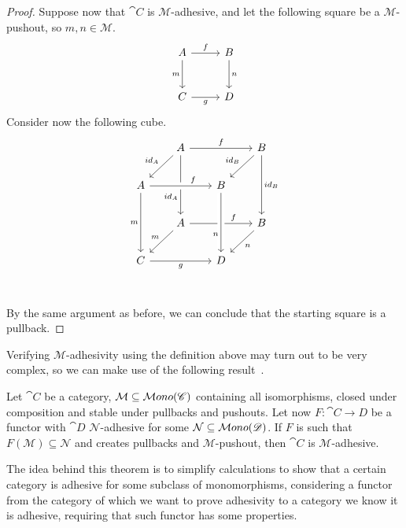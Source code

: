 \begin{proof}
	Suppose now that $\cat C$ is $\mathcal{M}$-adhesive, and let the following square be a $\mathcal{M}$-pushout, so $m, n \in \mathcal{M}$.
	\[\begin{tikzcd}[row sep = 26, column sep = 26]
		A \ar[r, "f"] \ar[d, "m"swap] & B \ar[d, "n"] \\
		C \ar[r, "g"swap] & D
	\end{tikzcd}\]
	Consider now the following cube.
	\[\begin{tikzcd}[row sep = 20, column sep = 20]
	& A && B \\
	A && B \\
	& A && B \\
	C && D \\
	& {}
	\arrow["f", from=1-2, to=1-4]
	\arrow["{id_A}"', from=1-2, to=2-1]
	\arrow["{id_A}"'{pos=0.7}, from=1-2, to=3-2]
	\arrow["{id_B}"', from=1-4, to=2-3]
	\arrow["{id_B}", from=1-4, to=3-4]
	\arrow["m"', from=2-1, to=4-1]
	\arrow["f"{pos=0.7}, from=3-2, to=3-4]
	\arrow["m"', from=3-2, to=4-1]
	\arrow["n", from=3-4, to=4-3]
	\arrow["g"', from=4-1, to=4-3]
	\arrow["f"{pos=0.7}, from=2-1, to=2-3, crossing over]
	\arrow["n"'{pos=0.7}, from=2-3, to=4-3, crossing over]
	\end{tikzcd}\]
	By the same argument as before, we can conclude that the starting square is a pullback.
\end{proof}

Verifying $\mathcal M$-adhesivity using the definition above may turn out to be very complex, so we can make use of the following result~\cite{castelnovo2022newcriterionmathcalmmathcalnadhesivity}. 

\begin{theorem}\label{th:crit_for_adh}
    Let $\cat C$ be a category, $\mathcal M \subseteq \mathcal{M}ono(\mathscr{C})$ containing all isomorphisms, closed under composition and stable under pullbacks and pushouts. Let now $F: \cat{C \rightarrow D}$ be a functor with $\cat D$ $\mathcal{N}$-adhesive for some $\mathcal{N} \subseteq \mathcal{M}ono(\mathscr{D})$.
    If $F$ is such that $F(\mathcal{M}) \subseteq \mathcal N$ and creates pullbacks and $\mathcal{M}$-pushout, then $\cat C$ is $\mathcal M$-adhesive.
\end{theorem}

The idea behind this theorem is to simplify calculations to show that a certain category is adhesive for some subclass of monomorphisms, considering a functor from the category of which we want to prove adhesivity to a category we know it is adhesive, requiring that such functor has some properties.

